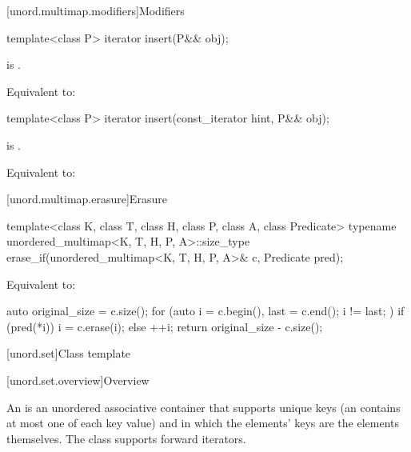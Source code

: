 [unord.multimap.modifiers]{Modifiers}

%
\begin{itemdecl}
template<class P>
  iterator insert(P&& obj);
\end{itemdecl}

\begin{itemdescr}
\pnum
\constraints
{} is .

\pnum
\effects
Equivalent to: 
\end{itemdescr}

%
\begin{itemdecl}
template<class P>
  iterator insert(const_iterator hint, P&& obj);
\end{itemdecl}

\begin{itemdescr}
\pnum
\constraints
{} is .

\pnum
\effects
Equivalent to:
\end{itemdescr}

[unord.multimap.erasure]{Erasure}

%
\begin{itemdecl}
template<class K, class T, class H, class P, class A, class Predicate>
  typename unordered_multimap<K, T, H, P, A>::size_type
    erase_if(unordered_multimap<K, T, H, P, A>& c, Predicate pred);
\end{itemdecl}

\begin{itemdescr}
\pnum
\effects
Equivalent to:
\begin{codeblock}
auto original_size = c.size();
for (auto i = c.begin(), last = c.end(); i != last; ) {
  if (pred(*i)) {
    i = c.erase(i);
  } else {
    ++i;
  }
}
return original_size - c.size();
\end{codeblock}
\end{itemdescr}

[unord.set]{Class template }%

[unord.set.overview]{Overview}

\pnum
{}%
%
An  is an unordered associative container that
supports unique keys (an  contains at most one of each
key value) and in which the elements' keys are the elements
themselves.
The  class
supports forward iterators.

